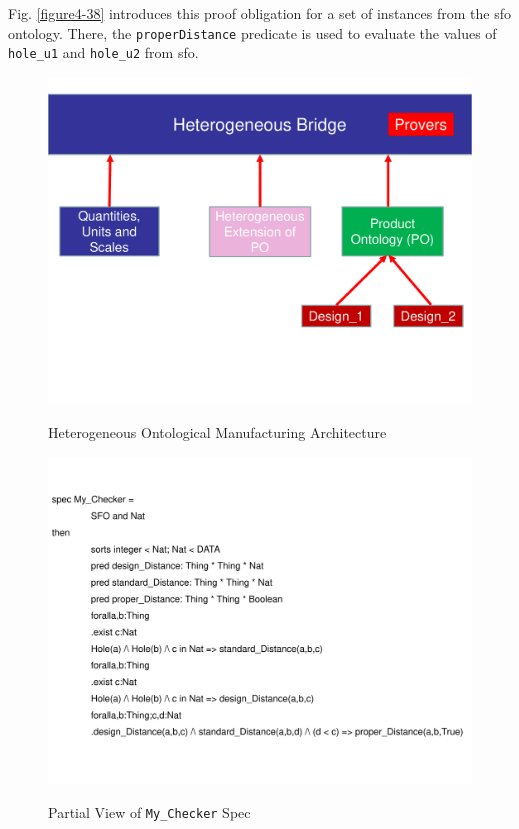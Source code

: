 Fig. \ref{figure4-38} introduces this proof obligation for a set of instances from the \gls{sfo} ontology. There, the \texttt{properDistance} predicate is used to evaluate the values of \texttt{hole\_u1} and \texttt{hole\_u2} from \gls{sfo}. 


\begin{figure}
\begin{center}
	\includegraphics[scale=0.5]{figure-chapterIV/fig4-36.pdf}\\
	\vspace{-10mm}
	\caption{Heterogeneous Ontological Manufacturing Architecture }
	\label{figure4-36}
\end{center}
\end{figure}



\begin{figure}

\begin{center}
	\includegraphics[scale=0.7, angle=90]{figure-chapterIV/fig4-37.pdf}\\
	\caption{Partial View of \texttt{My\_Checker} Spec}
	\label{figure4-37}
\end{center}

\end{figure}


